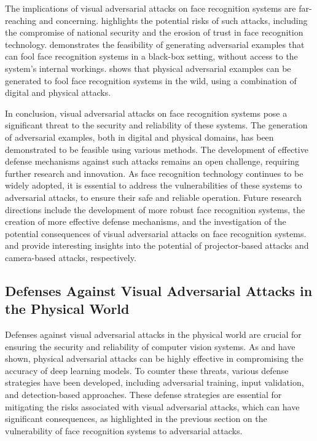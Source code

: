 \documentclass[11pt,a4paper]{article}
\begin{document}
The implications of visual adversarial attacks on face recognition systems are far-reaching and concerning. \cite{doi:10.1201/9781351251389-8} highlights the potential risks of such attacks, including the compromise of national security and the erosion of trust in face recognition technology. \cite{doi:10.1109/tip.2021.3092822} demonstrates the feasibility of generating adversarial examples that can fool face recognition systems in a black-box setting, without access to the system's internal workings. \cite{doi:10.1016/j.patcog.2022.109009} shows that physical adversarial examples can be generated to fool face recognition systems in the wild, using a combination of digital and physical attacks.

In conclusion, visual adversarial attacks on face recognition systems pose a significant threat to the security and reliability of these systems. The generation of adversarial examples, both in digital and physical domains, has been demonstrated to be feasible using various methods. The development of effective defense mechanisms against such attacks remains an open challenge, requiring further research and innovation. As face recognition technology continues to be widely adopted, it is essential to address the vulnerabilities of these systems to adversarial attacks, to ensure their safe and reliable operation. Future research directions include the development of more robust face recognition systems, the creation of more effective defense mechanisms, and the investigation of the potential consequences of visual adversarial attacks on face recognition systems. \cite{arxiv:1904.00759} and \cite{doi:10.1109/vr51125.2022.00073} provide interesting insights into the potential of projector-based attacks and camera-based attacks, respectively.


\subsection{Defenses Against Visual Adversarial Attacks in the Physical World}


Defenses against visual adversarial attacks in the physical world are crucial for ensuring the security and reliability of computer vision systems. As \cite{arxiv:1707.08945} and \cite{doi:10.1109/lcomm.2019.2901469} have shown, physical adversarial attacks can be highly effective in compromising the accuracy of deep learning models. To counter these threats, various defense strategies have been developed, including adversarial training, input validation, and detection-based approaches. These defense strategies are essential for mitigating the risks associated with visual adversarial attacks, which can have significant consequences, as highlighted in the previous section on the vulnerability of face recognition systems to adversarial attacks.
\end{document}
